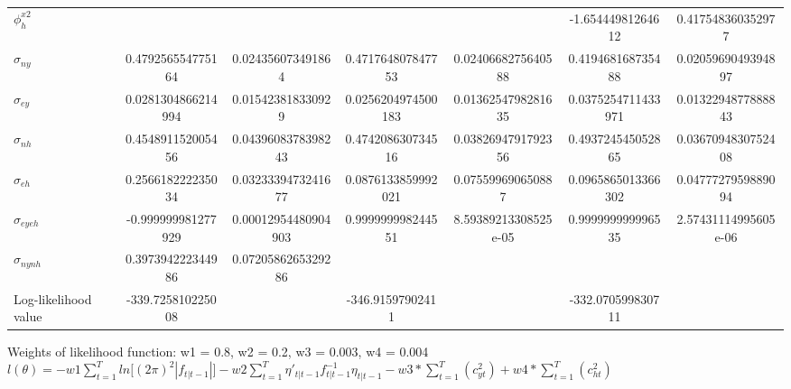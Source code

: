\documentclass[
  12pt,
]{article}
\begin{document}
\begin{landscape}
\begin{table}[]
\begin{threeparttable}
\begin{tabular}{@{}lSSSSSS@{}}
                        $\phi^{x2}_{h}$ &  &  &  &  & -1.65444981264612 & 0.417548360352977 \\[2pt] 

                        $\sigma_{ny}$ & 0.479256554775164 & 0.024356073491864 & 0.471764807847753 & 0.0240668275640588 & 0.419468168735488 & 0.0205969049394897 \\[2pt] 

                        $\sigma_{ey}$ & 0.0281304866214994 & 0.015423818330929 & 0.0256204974500183 & 0.0136254798281635 & 0.0375254711433971 & 0.0132294877888843 \\[2pt] 

                        $\sigma_{nh}$ & 0.454891152005456 & 0.0439608378398243 & 0.474208630734516 & 0.0382694791792356 & 0.493724545052865 & 0.0367094830752408 \\[2pt] 

                        $\sigma_{eh}$ & 0.256618222235034 & 0.0323339473241677 & 0.0876133859992021 & 0.075599690650887 & 0.0965865013366302 & 0.0477727959889094 \\[2pt] 

                        $\sigma_{eyeh}$ & -0.999999981277929 & 0.00012954480904903 & 0.999999998244551 & 8.59389213308525e-05 & 0.999999999996535 & 2.57431114995605e-06 \\[2pt] 

                        $\sigma_{nynh}$ & 0.397394222344986 & 0.0720586265329286 &  &  &  &  \\[2pt] 

                        Log-likelihood value & -339.725810225008 &  & -346.91597902411 &  & -332.070599830711 &  \\[2pt] 

                                                
                        \bottomrule
                    \end{tabular}
                    \begin{tablenotes}
                        \small
                        \item Weights of likelihood function: w1 = 0.8, w2 = 0.2, w3 = 0.003, w4 = 0.004 \\
                        $l(\theta) = -w1\sum_{t=1}^{T}ln\lbrack(2\pi)^2|f_{t|t-1}|\rbrack
                        -w2\sum_{t=1}^{T}\eta'_{t|t-1}f^{-1}_{t|t-1}\eta_{t|t-1}
                        - w3*\sum_{t=1}^{T}(c_{yt}^2) + w4*\sum_{t=1}^{T}(c_{ht}^2)$
                    \end{tablenotes}
                \end{threeparttable}
            \end{table}
            
        \end{landscape}
        
\end{document}
